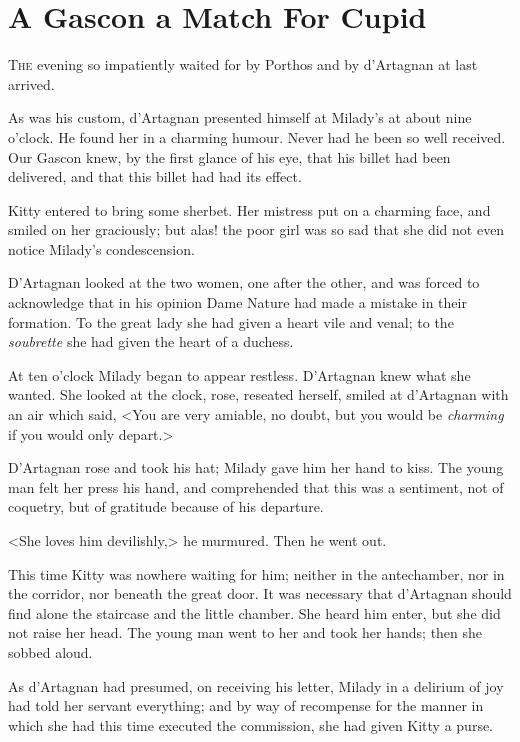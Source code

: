 
\chapter{A Gascon a Match For Cupid}

\lettrine[]{T}{he} evening so impatiently waited for by Porthos and by d'Artagnan at last arrived. 

\zz
As was his custom, d'Artagnan presented himself at Milady's at about nine o'clock. He found her in a charming humour. Never had he been so well received. Our Gascon knew, by the first glance of his eye, that his billet had been delivered, and that this billet had had its effect. 

Kitty entered to bring some sherbet. Her mistress put on a charming face, and smiled on her graciously; but alas! the poor girl was so sad that she did not even notice Milady's condescension. 

D'Artagnan looked at the two women, one after the other, and was forced to acknowledge that in his opinion Dame Nature had made a mistake in their formation. To the great lady she had given a heart vile and venal; to the \textit{soubrette} she had given the heart of a duchess. 

At ten o'clock Milady began to appear restless. D'Artagnan knew what she wanted. She looked at the clock, rose, reseated herself, smiled at d'Artagnan with an air which said, <You are very amiable, no doubt, but you would be \textit{charming} if you would only depart.> 

D'Artagnan rose and took his hat; Milady gave him her hand to kiss. The young man felt her press his hand, and comprehended that this was a sentiment, not of coquetry, but of gratitude because of his departure. 

<She loves him devilishly,> he murmured. Then he went out. 

This time Kitty was nowhere waiting for him; neither in the antechamber, nor in the corridor, nor beneath the great door. It was necessary that d'Artagnan should find alone the staircase and the little chamber. She heard him enter, but she did not raise her head. The young man went to her and took her hands; then she sobbed aloud. 

As d'Artagnan had presumed, on receiving his letter, Milady in a delirium of joy had told her servant everything; and by way of recompense for the manner in which she had this time executed the commission, she had given Kitty a purse. 

